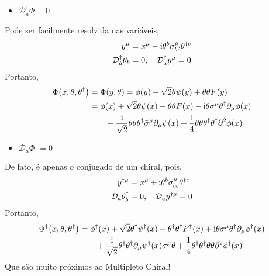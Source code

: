 \documentclass{beamer}
\begin{document}
\begin{frame}
    \begin{itemize}
        \item $\mathcal D^\dagger_{\dot a}\Phi=0$
    \end{itemize}
    Pode ser facilmente resolvida nas variáveis,
    \begin{align*}
        y^\mu&=x^\mu-\textnormal{i}\theta^b\sigma^\mu_{b\dot c}\theta^{\dagger \dot c}\\
        \mathcal D^\dagger_{\dot a}\theta_b&=0,\ \ \ \mathcal D^\dagger_{\dot a}y^\mu=0
    \end{align*}
    Portanto,
    \begin{align*}
        \Phi\qty(x,\theta,\theta^\dagger)&=\Phi\qty(y,\theta)=\phi\qty(y)+\sqrt2\theta\psi\qty(y)+\theta\theta F\qty(y)\\
        &=\phi\qty(x)+\sqrt2\theta\psi\qty(x)+\theta\theta F\qty(x)-\textnormal{i}\theta\sigma^\mu\theta^\dagger\partial_\mu\phi\qty(x)\\
        &\quad\quad-\frac{\textnormal{i}}{\sqrt2}\theta\theta\theta^\dagger{\bar\sigma}^\mu\partial_\mu\psi\qty(x)+\frac14\theta\theta\theta^\dagger\theta^\dagger\partial^2\phi\qty(x)
    \end{align*}
\end{frame}

\begin{frame}
    \begin{itemize}
        \item $\mathcal D_{ a}\Phi^\dagger=0$
    \end{itemize}
    De fato, é apenas o conjugado de um chiral, pois,
    \begin{align*}
        y^{\dagger\mu}&=x^\mu+\textnormal{i}\theta^b\sigma^\mu_{b\dot c}\theta^{\dagger \dot c}\\
        \mathcal D_{ a}\theta^\dagger_b&=0,\ \ \ \mathcal D_{ a}y^{\dagger\mu}=0
    \end{align*}
    Portanto,
    \begin{align*}
        \Phi^\dagger\qty(x,\theta,\theta^\dagger)&=\phi^\dagger\qty(x)+\sqrt2\theta^\dagger\psi^\dagger\qty(x)+\theta^\dagger\theta^\dagger F^\dagger\qty(x)+\textnormal{i}\theta\sigma^\mu\theta^\dagger\partial_\mu\phi^\dagger\qty(x)\\
        &\quad\quad+\frac{\textnormal{i}}{\sqrt2}\theta^\dagger\theta^\dagger\partial_\mu\psi^\dagger\qty(x){\bar\sigma}^\mu\theta+\frac14\theta^\dagger\theta^\dagger\theta\theta\partial^2\phi^\dagger\qty(x)
    \end{align*}
    Que são muito próximos ao Multipleto Chiral! 
\end{frame}
\end{document}
